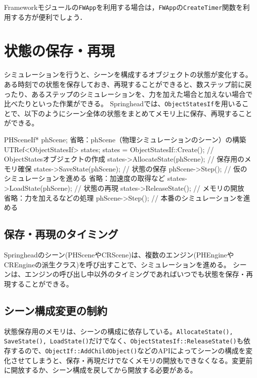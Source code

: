 Framework\KLUDGE モジュールの\texttt{FWApp}\KLUDGE を利用する場合は，\texttt{FWApp}\KLUDGE の\texttt{CreateTimer}\KLUDGE 関数を利用する方が便利でしょう．


\section{\KLUDGE 状態の保存・再現}
\KLUDGE シミュレーションを行うと、シーンを構成するオブジェクトの状態が変化する。
\KLUDGE ある時刻での状態を保存しておき、再現することができると、数ステップ前に戻ったり、あるステップのシミュレーションを、力を加えた場合と加えない場合で比べたりといった作業ができる。
Springhead\KLUDGE では、\texttt{ObjectStatesIf}\KLUDGE を用いることで、以下のようにシーン全体の状態をまとめてメモリ上に保存、再現することができる。

\begin{sourcecode}
	PHSceneIf* phScene;
	省略：phScene（物理シミュレーションのシーン）の構築
	UTRef<ObjectStatesIf> states;
	states = ObjectStatesIf::Create();	// ObjectStatesオブジェクトの作成
	states->AllocateState(phScene);		// 保存用のメモリ確保
	states->SaveState(phScene);			// 状態の保存
	phScene->Step();					// 仮のシミュレーションを進める
	省略：加速度の取得など
	states->LoadState(phScene);			// 状態の再現
	states->ReleaseState();				// メモリの開放
	省略：力を加えるなどの処理
	phScene->Step();					// 本番のシミュレーションを進める
\end{sourcecode}

\subsection{\KLUDGE 保存・再現のタイミング}
Springhead\KLUDGE のシーン(PHScene\KLUDGE やCRScene)\KLUDGE は、複数のエンジン(PHEngine\KLUDGE やCREngine\KLUDGE の派生クラス)\KLUDGE を呼び出すことで、シミュレーションを進める。
\KLUDGE シーンは、エンジンの呼び出し中以外のタイミングであればいつでも状態を保存・再現することができる。

\subsection{\KLUDGE シーン構成変更の制約}
\KLUDGE 状態保存用のメモリは、シーンの構成に依存している。\texttt{AllocateState(), SaveState(), LoadState()}\KLUDGE だけでなく、\texttt{ObjectStatesIf::ReleaseState()}\KLUDGE も依存するので、\texttt{ObjectIf::AddChildObject()}\KLUDGE などのAPI\KLUDGE によってシーンの構成を変化させてしまうと、保存・再現だけでなくメモリの開放もできなくなる。変更前に開放するか、シーン構成を戻してから開放する必要がある。
